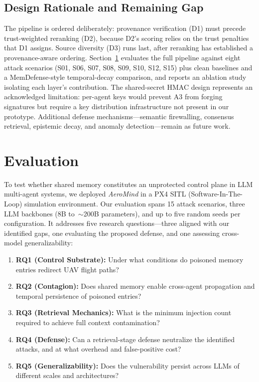 \documentclass[conference]{IEEEtran}
\begin{document}
\subsection{Design Rationale and Remaining Gap}
The pipeline is ordered deliberately: provenance verification (D1) must precede trust-weighted reranking (D2), because D2's scoring relies on the trust penalties that D1 assigns. Source diversity (D3) runs last, after reranking has established a provenance-aware ordering. Section~\ref{sec:evaluation} evaluates the full pipeline against eight attack scenarios (S01, S06, S07, S08, S09, S10, S12, S15) plus clean baselines and a MemDefense-style temporal-decay comparison, and reports an ablation study isolating each layer's contribution. The shared-secret HMAC design represents an acknowledged limitation: per-agent keys would prevent A3 from forging signatures but require a key distribution infrastructure not present in our prototype. Additional defense mechanisms---semantic firewalling, consensus retrieval, epistemic decay, and anomaly detection---remain as future work.


\section{Evaluation}
\label{sec:evaluation}

To test whether shared memory constitutes an unprotected control plane in LLM multi-agent systems, we deployed \textit{AeroMind} in a PX4 SITL (Software-In-The-Loop) simulation environment. Our evaluation spans 15 attack scenarios, three LLM backbones (8B to~${\sim}$200B parameters), and up to five random seeds per configuration. It addresses five research questions---three aligned with our identified gaps, one evaluating the proposed defense, and one assessing cross-model generalizability:
\begin{enumerate}
    \item \textbf{RQ1 (Control Substrate):} Under what conditions do poisoned memory entries redirect UAV flight paths?
    \item \textbf{RQ2 (Contagion):} Does shared memory enable cross-agent propagation and temporal persistence of poisoned entries?
    \item \textbf{RQ3 (Retrieval Mechanics):} What is the minimum injection count required to achieve full context contamination?
    \item \textbf{RQ4 (Defense):} Can a retrieval-stage defense neutralize the identified attacks, and at what overhead and false-positive cost?
    \item \textbf{RQ5 (Generalizability):} Does the vulnerability persist across LLMs of different scales and architectures?
\end{enumerate}
\end{document}

